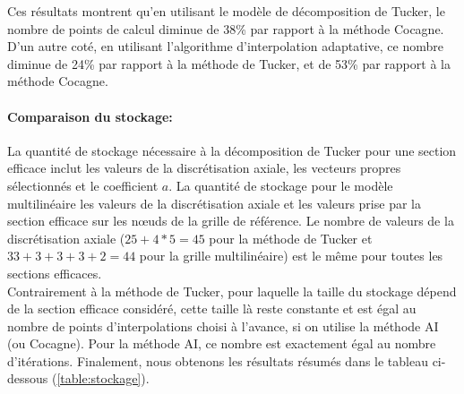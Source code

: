 \newpage
\hspace{0.5cm} Ces résultats montrent qu'en utilisant le modèle de décomposition de Tucker, le nombre de points de calcul diminue de 38\% par rapport à la méthode Cocagne. D'un autre coté, en utilisant l'algorithme d'interpolation adaptative, ce nombre diminue de 24\% par rapport à la méthode de Tucker, et de 53\% par rapport à la méthode Cocagne.

\paragraph{Comparaison du stockage:\\}
\hspace{0.5cm} La quantité de stockage nécessaire à la décomposition de Tucker pour une section efficace inclut les valeurs de la discrétisation axiale, les vecteurs propres sélectionnés et le coefficient $a$. La quantité de stockage pour le modèle multilinéaire les valeurs de la discrétisation axiale et les valeurs prise par la section efficace sur les nœuds de la grille de référence. Le nombre de valeurs de la discrétisation axiale ($25+4*5=45$ pour la méthode de Tucker et $33+3+3+3+2=44$ pour la grille multilinéaire) est le même pour toutes les sections efficaces.\\
\hspace{0.5cm} Contrairement à la méthode de Tucker, pour laquelle la taille du stockage dépend de la section efficace considéré, cette taille là reste constante et est égal au nombre de points d'interpolations choisi à l'avance, si on utilise la méthode AI (ou Cocagne). Pour la méthode AI, ce nombre est exactement égal au nombre d'itérations. Finalement, nous obtenons les résultats résumés dans le tableau ci-dessous (\ref{table:stockage}).\\

